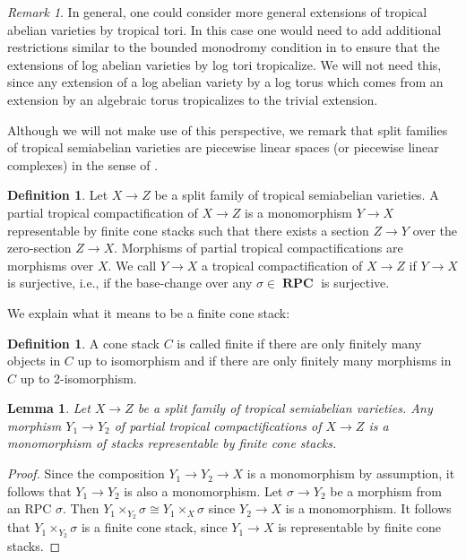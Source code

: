 \documentclass[11pt]{amsart}
\newtheorem{lemma}[theorem]{Lemma}
\theoremstyle{definition}
\newtheorem{definition}[theorem]{Definition}
\theoremstyle{remark}
\newtheorem{remark}[theorem]{Remark}
\DeclareMathOperator{\RPC}{\mathbf{RPC}}
\begin{document}
\begin{remark}
	In general, one could consider more general extensions of tropical abelian varieties by tropical tori.
	In this case one would need to add additional restrictions similar to the bounded monodromy condition
	in \cite{TheLogarithmicMolcho2022} to ensure that the extensions of log abelian varieties by log tori
	tropicalize. We will not need this, since any extension of a log abelian variety by a log torus
	which comes from an extension by an algebraic torus tropicalizes to the trivial extension.
\end{remark}

Although we will not make use of this perspective, we remark that split families of tropical semiabelian varieties
are piecewise linear spaces (or piecewise linear complexes) in the sense of \cite{kennedyhunt2025logarithmicquotspacefoundations}.

\begin{definition}
	\label{def:partial_compact}
	Let $X\to Z$ be a split family of tropical semiabelian varieties. A partial tropical compactification of $X\to Z$ is a
	monomorphism $Y\to X$ representable by finite cone stacks such that there exists a section
	$Z\to Y$ over the zero-section $Z\to X$. Morphisms of partial tropical compactifications are morphisms over $X$.
	We call $Y\to X$ a tropical compactification of $X\to Z$ if $Y\to X$ is surjective, i.e., if the base-change
	over any $\sigma\in \RPC$ is surjective.
\end{definition}

We explain what it means to be a finite cone stack:

\begin{definition}
	A cone stack $C$ is called finite if there are only finitely many objects in $C$ up to isomorphism and
	if there are only finitely many morphisms in $C$ up to 2-isomorphism.
\end{definition}

\begin{lemma}
	\label{lem:morph_part_comp_repr}
	Let $X\to Z$ be a split family of tropical semiabelian varieties.
	Any morphism $Y_1\to Y_2$ of partial tropical compactifications of $X\to Z$ is a monomorphism of stacks
	representable by finite cone stacks.
\end{lemma}

\begin{proof}
	Since the composition $Y_1\to Y_2\to X$ is a monomorphism by assumption, it follows that $Y_1\to Y_2$
	is also a monomorphism. Let $\sigma\to Y_2$ be a morphism from an RPC $\sigma$. Then
	$Y_1\times_{Y_2}\sigma\cong Y_1\times_{X}\sigma$ since $Y_2\to X$ is a monomorphism.
	It follows that $Y_1\times_{Y_2}\sigma$ is a finite cone stack, since $Y_1\to X$ is representable
	by finite cone stacks.
\end{proof}
\end{document}
